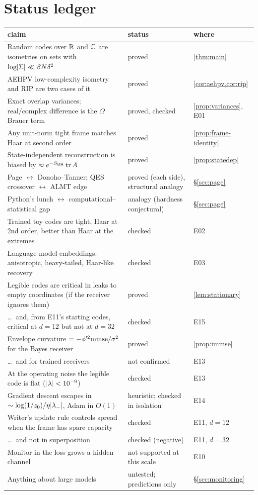 \section{Status ledger}\label{sec:ledger}
\begin{center}\small
\begin{tabularx}{\linewidth}{@{}>{\raggedright\arraybackslash}X l l@{}}\toprule
claim & status & where \\\midrule
Random codes over $\mathbb R$ and $\mathbb C$ are isometries on sets with $\log\lvert \Sigma\rvert\ll\beta N\delta^2$ & proved & \cref{thm:main} \\
AEHPV low-complexity isometry and RIP are two cases of it & proved & \cref{cor:aehpv,cor:rip} \\
Exact overlap variances; real/complex difference is the $\Omega$ Brauer term & proved, checked & \cref{prop:variances}, E01 \\
Any unit-norm tight frame matches Haar at second order & proved & \cref{prop:frame-identity} \\
State-independent reconstruction is biased by $\approx e^{-S_{\rm BH}}\operatorname{tr} A$ & proved & \cref{prop:statedep} \\
Page $\leftrightarrow$ Donoho--Tanner; QES crossover $\leftrightarrow$ ALMT edge & proved (each side), structural analogy & \S\ref{sec:page} \\
Python's lunch $\leftrightarrow$ computational--statistical gap & analogy (hardness conjectural) & \S\ref{sec:page} \\
Trained toy codes are tight, Haar at 2nd order, better than Haar at the extremes & checked & E02 \\
Language-model embeddings: anisotropic, heavy-tailed, Haar-like recovery & checked & E03 \\
Legible codes are critical in leaks to empty coordinates (if the receiver ignores them) & proved & \cref{lem:stationary} \\
\ldots\ and, from E11's starting codes, critical at $d=12$ but not at $d=32$ & checked & E15 \\
Envelope curvature $=-\phi'^2\mathrm{mmse}/\sigma^2$ for the Bayes receiver & proved & \cref{prop:immse} \\
\ldots\ and for trained receivers & not confirmed & E13 \\
At the operating noise the legible code is flat ($\lvert \lambda\rvert<10^{-9}$) & checked & E13 \\
Gradient descent escapes in $\sim\log(1/z_0)/\eta\lvert \lambda_-\rvert$, Adam in $O(1)$ & heuristic; checked in isolation & E14 \\
Writer's update rule controls spread when the frame has spare capacity & checked & E11, $d=12$ \\
\ldots\ and not in superposition & checked (negative) & E11, $d=32$ \\
Monitor in the loss grows a hidden channel & not supported at this scale & E10 \\
Anything about large models & untested; predictions only & \S\ref{sec:monitoring} \\
\bottomrule\end{tabularx}
\end{center}
